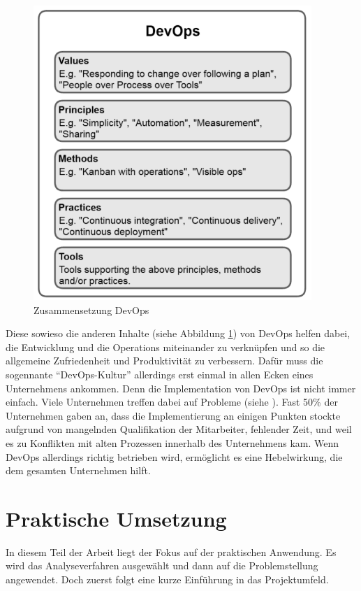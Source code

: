 \begin{figure}[h!]
	\centering
	\includegraphics[scale = 0.7]{img/DEVOPS.png}
	\caption{Zusammensetzung DevOps}
	\label{img:devops}
\end{figure}Diese sowieso die anderen Inhalte (siehe Abbildung \ref{img:devops}) von DevOps helfen dabei, die Entwicklung und die Operations miteinander zu verknüpfen und so die allgemeine Zufriedenheit und Produktivität zu verbessern. Dafür muss die sogennante \enquote{DevOps-Kultur} allerdings erst einmal in allen Ecken eines Unternehmens ankommen.\autocite[Vgl.][S.23]{Stahl.2018} Denn die Implementation von DevOps ist nicht immer einfach. Viele Unternehmen treffen dabei auf Probleme (siehe \cite{Claranet.2016}). Fast 50\% der Unternehmen gaben an, dass die Implementierung an einigen Punkten stockte aufgrund von mangelnden Qualifikation der Mitarbeiter, fehlender Zeit, und weil es zu Konflikten mit alten Prozessen innerhalb des Unternehmens kam.\autocite[Vgl.][]{Claranet.2016} Wenn DevOps allerdings richtig betrieben wird, ermöglicht es eine Hebelwirkung, die dem gesamten Unternehmen hilft.\autocite[Vgl.][S.24]{Stahl.2018} 
\chapter{Praktische Umsetzung}
In diesem Teil der Arbeit liegt der Fokus auf der praktischen Anwendung. Es wird das Analyseverfahren ausgewählt und dann auf die Problemstellung angewendet. Doch zuerst folgt eine kurze Einführung in das Projektumfeld.
